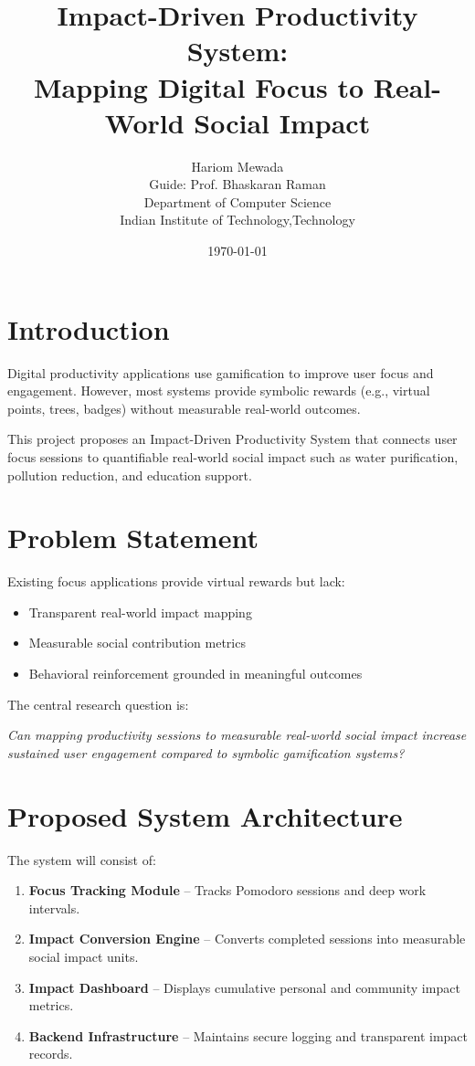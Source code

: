 \documentclass[12pt]{article}
\title{\textbf{Impact-Driven Productivity System:\\
Mapping Digital Focus to Real-World Social Impact}}
\author{Hariom Mewada \\
Guide: Prof. Bhaskaran Raman\\
Department of Computer Science \\
Indian Institute of Technology,Technology}
\date{\today}
\begin{document}
\maketitle

\section{Introduction}

Digital productivity applications use gamification to improve user focus and engagement. 
However, most systems provide symbolic rewards (e.g., virtual points, trees, badges) 
without measurable real-world outcomes.

This project proposes an Impact-Driven Productivity System that connects user focus 
sessions to quantifiable real-world social impact such as water purification, 
pollution reduction, and education support.

\section{Problem Statement}

Existing focus applications provide virtual rewards but lack:
\begin{itemize}
    \item Transparent real-world impact mapping
    \item Measurable social contribution metrics
    \item Behavioral reinforcement grounded in meaningful outcomes
\end{itemize}

The central research question is:

\textit{Can mapping productivity sessions to measurable real-world social impact 
increase sustained user engagement compared to symbolic gamification systems?}

\section{Proposed System Architecture}

The system will consist of:

\begin{enumerate}
    \item \textbf{Focus Tracking Module} – Tracks Pomodoro sessions and deep work intervals.
    \item \textbf{Impact Conversion Engine} – Converts completed sessions into measurable social impact units.
    \item \textbf{Impact Dashboard} – Displays cumulative personal and community impact metrics.
    \item \textbf{Backend Infrastructure} – Maintains secure logging and transparent impact records.
\end{enumerate}
\end{document}
